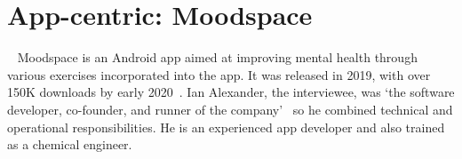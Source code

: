 \clearpage


\section{App-centric: Moodspace}~\label{case-study-overview-moodspace} %
Moodspace is an Android app aimed at improving mental health through various exercises incorporated into the app. %
It was released in 2019, with over 150K downloads by early 2020~\citep{objectbox2020_moodspace_interview}. Ian Alexander, the interviewee, was `the software developer, co-founder, and runner of the company'~\citep{objectbox2020_moodspace_interview} so he combined technical and operational responsibilities. He is an experienced app developer and also trained as a chemical engineer.

